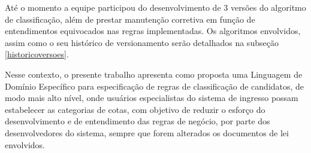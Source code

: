 Até o momento a equipe participou do desenvolvimento de 3 versões do algoritmo de classificação, além de prestar manutenção corretiva em função de entendimentos equivocados nas regras implementadas.  Os algoritmos envolvidos, assim como o seu histórico de versionamento serão detalhados na subseção \ref{historicoversoes}.

Nesse contexto, o presente trabalho apresenta como proposta uma Linguagem de Domínio Específico para especificação de regras de classificação de candidatos, de modo mais alto nível, onde usuários especialistas do sistema de ingresso possam estabelecer as categorias de cotas, com objetivo de reduzir o esforço do desenvolvimento e de entendimento das regras de negócio, por parte dos desenvolvedores do sistema, sempre que forem alterados os documentos de lei envolvidos.


